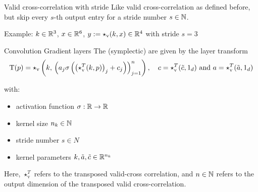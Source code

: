 \begin{frame}{Valid cross-correlation with stride}
  Like valid cross-correlation as defined before,\\
  but skip every $s$-th output entry
  for a stride number $s \in \mathbb{N}$.

  \vspace{0.6cm}
  Example:
  $k \in \mathbb{R}^3$,
  $x \in \mathbb{R}^6$,
  $y := \star_{\text{v}}(k,x) \in \mathbb{R}^4$ with stride $s=3$

  \vspace{0.3cm}
  \centering
\end{frame}

\begin{frame}[c]{Convolution Gradient layers}
  The (symplectic)  are given by the layer transform
  \begin{equation*}
    \mathrm{T}(p) = \star_{\text{v}} \left( k, \, 
    \left( a_j \sigma \left( \left( \star_{\text{v}}^T(k,p) \right)_j + c_j \right) \right)_{j=1}^n \right),
		\quad c = \star_{\text{v}}^T(\tilde{c},1_d) 
		\text{ and } a = \star_{\text{v}}^T(\tilde{a},1_d)
  \end{equation*}

  with:
  \begin{itemize}
    \item activation function $\sigma : \mathbb{R} \to \mathbb{R}$
    \item kernel size $n_k \in \mathbb{N}$
    \item stride number $s \in N$
    \item kernel parameters $k,\tilde{a},\tilde{c} \in \mathbb{R}^{n_k}$
  \end{itemize}

  Here, $\star_{\text{v}}^T$ refers to the transposed valid-cross
  correlation, and $n \in \mathbb{N}$ refers to the output dimension of the
  transposed valid cross-correlation.
\end{frame}

